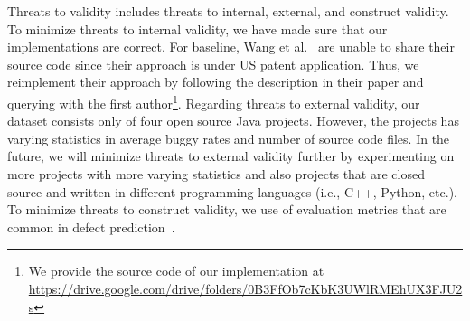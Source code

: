 {Threats to validity includes threats to internal, external, and construct validity. To minimize threats to internal validity, we have made sure that our implementations are correct. For baseline, Wang et al.~\cite{wang2016automatically} are unable to share their source code since their approach is under US patent application. Thus, we reimplement their approach by following the description in their paper and querying with the first author\footnote{We provide the source code of our implementation at \url{https://drive.google.com/drive/folders/0B3FfOb7cKbK3UWlRMEhUX3FJU2s}}. Regarding threats to external validity, our dataset consists only of four open source Java projects. However, the projects has varying statistics in average buggy rates and number of source code files. In the future, we will minimize threats to external validity further by experimenting on more projects with more varying statistics and also projects that are closed source and written in different programming languages (i.e., C++, Python, etc.). To minimize threats to construct validity, we use of evaluation metrics that are common in defect prediction~\cite{menzies2007data, menzies2010defect, nam2013transfer}.
}

